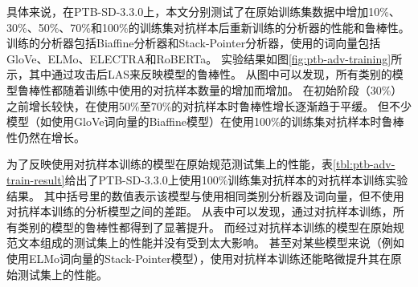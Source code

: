 具体来说，在PTB-SD-3.3.0上，本文分别测试了在原始训练集数据中增加10\%、30\%、50\%、70\%和100\%的训练集对抗样本后重新训练的分析器的性能和鲁棒性。
训练的分析器包括Biaffine分析器和Stack-Pointer分析器，使用的词向量包括GloVe、ELMo、ELECTRA和RoBERTa。
实验结果如图\ref{fig:ptb-adv-training}所示，其中通过攻击后LAS来反映模型的鲁棒性。
从图中可以发现，所有类别的模型鲁棒性都随着训练中使用的对抗样本数量的增加而增加。
在初始阶段（30\%）之前增长较快，在使用50\%至70\%的对抗样本时鲁棒性增长逐渐趋于平缓。
但不少模型（如使用GloVe词向量的Biaffine模型）在使用100\%的训练集对抗样本时鲁棒性仍然在增长。

为了反映使用对抗样本训练的模型在原始规范测试集上的性能，表\ref{tbl:ptb-adv-train-result}给出了PTB-SD-3.3.0上使用100\%训练集对抗样本的对抗样本训练实验结果。
其中括号里的数值表示该模型与使用相同类别分析器及词向量，但不使用对抗样本训练的分析模型之间的差距。
从表中可以发现，通过对抗样本训练，所有类别的模型的鲁棒性都得到了显著提升。
而经过对抗样本训练的模型在原始规范文本组成的测试集上的性能并没有受到太大影响。
甚至对某些模型来说（例如使用ELMo词向量的Stack-Pointer模型），使用对抗样本训练还能略微提升其在原始测试集上的性能。

